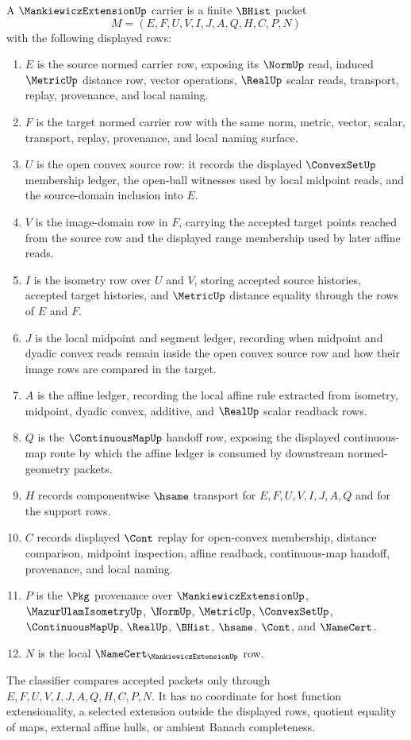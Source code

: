\begin{definition}
\label{def:mankiewicz-extension-carrier}
A $\MankiewiczExtensionUp$ carrier is a finite $\BHist$ packet
$$
M=(E,F,U,V,I,J,A,Q,H,C,P,N)
$$
with the following displayed rows:
\begin{enumerate}
\item $E$ is the source normed carrier row, exposing its $\NormUp$ read, induced $\MetricUp$ distance row, vector operations, $\RealUp$ scalar reads, transport, replay, provenance, and local naming.
\item $F$ is the target normed carrier row with the same norm, metric, vector, scalar, transport, replay, provenance, and local naming surface.
\item $U$ is the open convex source row: it records the displayed $\ConvexSetUp$ membership ledger, the open-ball witnesses used by local midpoint reads, and the source-domain inclusion into $E$.
\item $V$ is the image-domain row in $F$, carrying the accepted target points reached from the source row and the displayed range membership used by later affine reads.
\item $I$ is the isometry row over $U$ and $V$, storing accepted source histories, accepted target histories, and $\MetricUp$ distance equality through the rows of $E$ and $F$.
\item $J$ is the local midpoint and segment ledger, recording when midpoint and dyadic convex reads remain inside the open convex source row and how their image rows are compared in the target.
\item $A$ is the affine ledger, recording the local affine rule extracted from isometry, midpoint, dyadic convex, additive, and $\RealUp$ scalar readback rows.
\item $Q$ is the $\ContinuousMapUp$ handoff row, exposing the displayed continuous-map route by which the affine ledger is consumed by downstream normed-geometry packets.
\item $H$ records componentwise $\hsame$ transport for $E,F,U,V,I,J,A,Q$ and for the support rows.
\item $C$ records displayed $\Cont$ replay for open-convex membership, distance comparison, midpoint inspection, affine readback, continuous-map handoff, provenance, and local naming.
\item $P$ is the $\Pkg$ provenance over $\MankiewiczExtensionUp$, $\MazurUlamIsometryUp$, $\NormUp$, $\MetricUp$, $\ConvexSetUp$, $\ContinuousMapUp$, $\RealUp$, $\BHist$, $\hsame$, $\Cont$, and $\NameCert$.
\item $N$ is the local $\NameCert_{\MankiewiczExtensionUp}$ row.
\end{enumerate}
The classifier compares accepted packets only through $E,F,U,V,I,J,A,Q,H,C,P,N$. It has no coordinate for host function extensionality, a selected extension outside the displayed rows, quotient equality of maps, external affine hulls, or ambient Banach completeness.
\end{definition}

